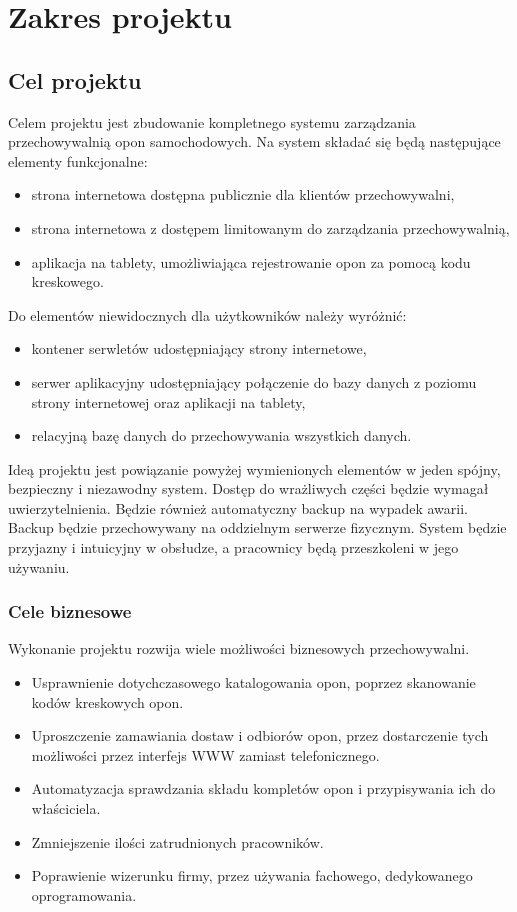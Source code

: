 \section{Zakres projektu}
  \subsection{Cel projektu}
    Celem projektu jest zbudowanie kompletnego systemu zarządzania przechowywalnią opon samochodowych.
    Na system składać się będą następujące elementy funkcjonalne:
    \begin{itemize}
      \item strona internetowa dostępna publicznie dla klientów przechowywalni,
      \item strona internetowa z dostępem limitowanym do zarządzania przechowywalnią,
      \item aplikacja na tablety, umożliwiająca rejestrowanie opon za pomocą kodu kreskowego.
    \end{itemize}
    Do elementów niewidocznych dla użytkowników należy wyróżnić:
    \begin{itemize}
      \item kontener serwletów udostępniający strony internetowe,
      \item serwer aplikacyjny udostępniający połączenie do bazy danych z poziomu strony internetowej oraz aplikacji na tablety,
      \item relacyjną bazę danych do przechowywania wszystkich danych.
    \end{itemize}
    Ideą projektu jest powiązanie powyżej wymienionych elementów w jeden spójny, bezpieczny i niezawodny system.
    Dostęp do wrażliwych części będzie wymagał uwierzytelnienia.
    Będzie również automatyczny backup na wypadek awarii.
    Backup będzie przechowywany na oddzielnym serwerze fizycznym.
    System będzie przyjazny i intuicyjny w obsłudze, a pracownicy będą przeszkoleni w jego używaniu.
    \subsubsection{Cele biznesowe}
      Wykonanie projektu rozwija wiele możliwości biznesowych przechowywalni.
      \begin{itemize}
        \item Usprawnienie dotychczasowego katalogowania opon, poprzez skanowanie kodów kreskowych opon.
        \item Uproszczenie zamawiania dostaw i odbiorów opon, przez dostarczenie tych możliwości przez interfejs WWW zamiast telefonicznego.
        \item Automatyzacja sprawdzania składu kompletów opon i przypisywania ich do właściciela.
        \item Zmniejszenie ilości zatrudnionych pracowników.
        \item Poprawienie wizerunku firmy, przez używania fachowego, dedykowanego oprogramowania.
      \end{itemize}
